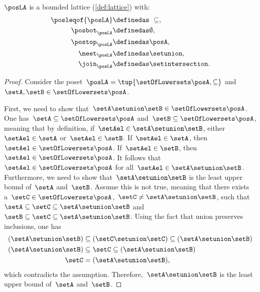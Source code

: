 \begin{lemma}
	$\posLA$ is a bounded lattice (\cref{def:lattice}) with:
	\begin{equation}
		\begin{aligned}
			\posleqof{\posLA} & \definedas \ \subseteq,      \\
			\posbot_{\posLA}  & \definedas \emptyset,        \\
			\postop_{\posLA}  & \definedas \posA,            \\
			\meet_{\posLA}    & \definedas \setunion,        \\
			\join_{\posLA}    & \definedas \setintersection.
		\end{aligned}
	\end{equation}
\end{lemma}
\begin{proof}
	Consider the poset~$\posLA=\tup{\setOfLowersets \posA,\subseteq}$ and~$\setA,\setB\in \setOfLowersets \posA$.

	First, we need to show that~$\setA\setunion \setB\in \setOfLowersets \posA$.
	One has~$\setA \subseteq \setOfLowersets \posA$ and~$\setB\subseteq \setOfLowersets \posA$, meaning that by definition, if~$\setAel\in \setA\setunion \setB$, either~$\setAel\in \setA$ or~$\setAel\in \setB$.
	If~$\setAel\in \setA$, then~$\setAel\in \setOfLowersets \posA$.
	If~$\setAel\in \setB$, then~$\setAel\in \setOfLowersets \posA$.
	It follows that~$\setAel\in \setOfLowersets \posA$ for all~$\setAel\in \setA\setunion \setB$.
	Furthermore, we need to show that~$\setA\setunion \setB$ is the least upper bound of~$\setA$ and~$\setB$.
	Assume this is not true, meaning that there exists a~$\setC\in \setOfLowersets \posA$,~$\setC\neq \setA\setunion \setB$, such that~$\setA\subseteq \setC\subseteq \setA\setunion \setB$ and~$\setB\subseteq \setC\subseteq \setA\setunion \setB$.
	Using the fact that union preserves inclusions, one has
	\begin{equation}
		\begin{aligned}
			(\setA\setunion \setB)
			                       & \subseteq (\setC\setunion \setC) \subseteq (\setA\setunion \setB) \\
			(\setA\setunion \setB) & \subseteq \setC \subseteq (\setA\setunion \setB)                  \\
			\setC                  & = (\setA\setunion \setB),
		\end{aligned}
	\end{equation}
	which contradicts the assumption.
	Therefore,~$\setA\setunion \setB$ is the least upper bound of~$\setA$ and~$\setB$.


\end{proof}
